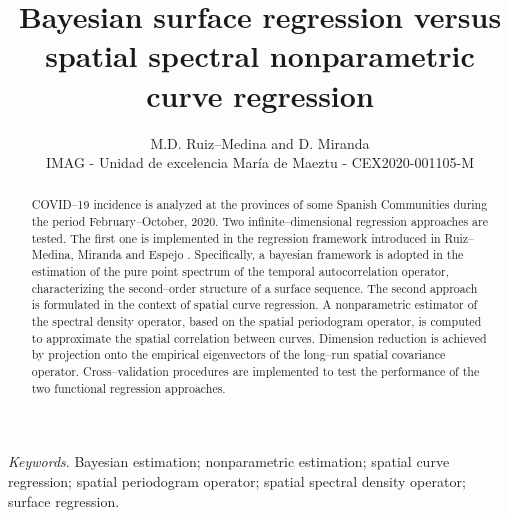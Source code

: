 \documentclass[11pt,a4paper]{article}
\begin{document}
\sf


\title{\bfseries  Bayesian  surface regression versus  spatial  spectral nonparametric  curve regression}

\date{}

\author{M.D. Ruiz--Medina and D. Miranda\\ IMAG - Unidad de excelencia María de Maeztu - CEX2020-001105-M}

 \maketitle
\begin{abstract}
COVID--19 incidence is analyzed at
 the provinces of some  Spanish
Communities during the period  February--October, 2020. Two infinite--dimensional regression approaches are tested.  The first one is  implemented in the regression  framework introduced in Ruiz--Medina, Miranda and Espejo \cite{RuizMedinaMirandaEspejo19}.  Specifically, a bayesian framework is adopted in the  estimation of the pure point spectrum of the temporal autocorrelation operator, characterizing the second--order structure of a surface sequence.  The second approach is formulated in the context of spatial curve regression. A nonparametric estimator of the spectral density operator,  based on
the spatial periodogram operator, is computed to approximate the spatial correlation between curves.  Dimension reduction is achieved by projection onto  the empirical eigenvectors of the  long--run spatial covariance operator. Cross--validation  procedures are  implemented to test the performance of the two functional regression approaches.
\end{abstract}


\medskip
\noindent \emph{Keywords}.  Bayesian estimation; nonparametric estimation;  spatial curve regression;  spatial periodogram operator;
spatial  spectral density operator;  surface regression.
\end{document}
